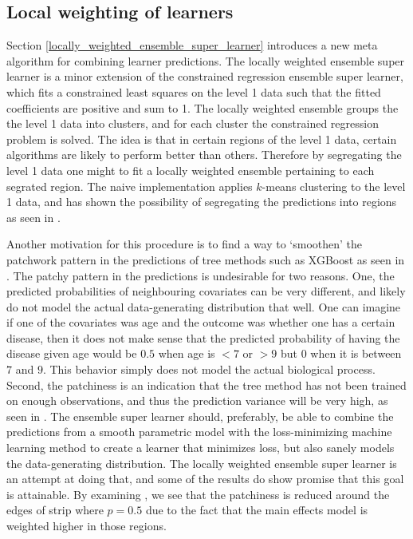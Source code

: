 \documentclass[11pt, a4paper]{article}
\theoremstyle{definition}
\theoremstyle{remark}
\begin{document}
\subsection{Local weighting of learners}
Section \ref{locally_weighted_ensemble_super_learner} introduces a new meta algorithm for combining learner predictions. The locally weighted ensemble super learner is a minor extension of the constrained regression ensemble super learner, which fits a constrained least squares on the level 1 data such that the fitted coefficients are positive and sum to 1. The locally weighted ensemble groups the the level 1 data into clusters, and for each cluster the constrained regression problem is solved. The idea is that in certain regions of the level 1 data, certain algorithms are likely to perform better than others. Therefore by segregating the level 1 data one might to fit a locally weighted ensemble pertaining to each segrated region. The naive implementation applies $ k $-means clustering to the level 1 data, and has shown the possibility of segregating the predictions into regions as seen in . 

Another motivation for this procedure is to find a way to `smoothen' the patchwork pattern in the predictions of tree methods such as XGBoost as seen in . The patchy pattern in the predictions is undesirable for two reasons. One, the predicted probabilities of neighbouring covariates can be very different, and likely do not model the actual data-generating distribution that well. One can imagine if one of the covariates was age and the outcome was whether one has a certain disease, then it does not make sense that the predicted probability of having the disease given age would be $ 0.5 $ when age is $ <7 $ or $ >9 $ but $ 0 $ when it is between $ 7 $ and $ 9 $. This behavior simply does not model the actual biological process. Second, the patchiness is an indication that the tree method has not been trained on enough observations, and thus the prediction variance will be very high, as seen in . 
The ensemble super learner should, preferably, be able to combine the predictions from a smooth parametric model with the loss-minimizing machine learning method to create a learner that minimizes loss, but also sanely models the data-generating distribution. The locally weighted ensemble super learner is an attempt at doing that, and some of the results do show promise that this goal is attainable. By examining , we see that the patchiness is reduced around the edges of strip where $ p = 0.5 $ due to the fact that the main effects model is weighted higher in those regions.
\end{document}
